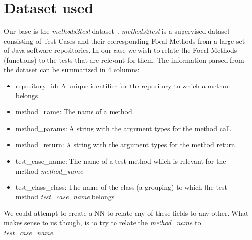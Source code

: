 \documentclass[a4paper, 11pt]{report}
\begin{document}
\section{Dataset used}
Our base is the \textit{methods2test} dataset~\cite{tufano2021unit}. \textit{methods2test} is a supervised dataset consisting of Test Cases and their corresponding Focal Methods from a large set of Java software repositories. In our case we wish to relate the Focal Methods (functions) to the tests that are relevant for them. The information parsed from the dataset can be summarized in 4 columns:
\begin{itemize}
    \item repository\_id: A unique identifier for the repository to which a method belongs.
    \item method\_name: The name of a method.
    \item method\_params: A string with the argument types for the method call.
    \item method\_return: A string with the argument types for the method return.
    \item test\_case\_name: The name of a test method which is relevant for the method \textit{method\_name}
    \item test\_class\_class: The name of the class (a grouping) to which the test method \textit{test\_case\_name} belongs.
\end{itemize}

We could attempt to create a NN to relate any of these fields to any other. What makes sense to us though, is to try to relate the \textit{method\_name} to \textit{test\_case\_name}.
\end{document}
